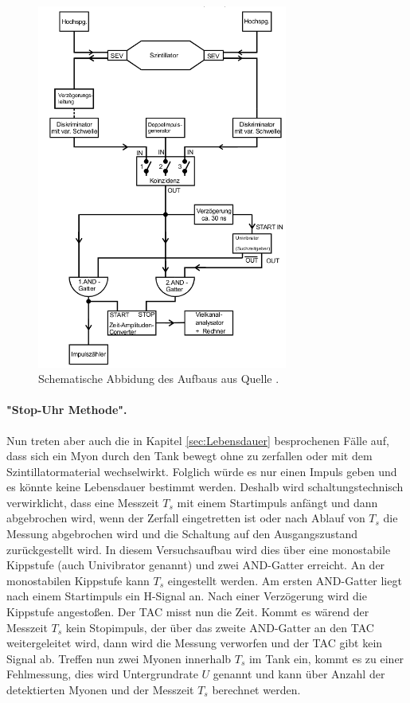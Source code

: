 \begin{figure}
  \centering
  \includegraphics[height=12cm]{pics/Aufbau.png}
  \caption{Schematische Abbidung des Aufbaus aus Quelle \cite{Anleitung}.}
  \label{fig:aufbau}
\end{figure}

\paragraph{"Stop-Uhr Methode".}
Nun treten aber auch die in Kapitel 
\ref{sec:Lebensdauer} besprochenen Fälle auf, dass sich ein Myon durch den Tank bewegt ohne zu zerfallen oder mit 
dem Szintillatormaterial wechselwirkt. Folglich würde es nur einen Impuls geben und es könnte keine Lebensdauer 
bestimmt werden. Deshalb wird schaltungstechnisch verwirklicht, dass eine Messzeit $T_s$ mit einem Startimpuls 
anfängt und dann abgebrochen wird, wenn der Zerfall eingetretten ist oder nach Ablauf von $T_s$ die Messung 
abgebrochen wird und die Schaltung auf den Ausgangszustand zurückgestellt wird. In diesem Versuchsaufbau wird 
dies über eine monostabile Kippstufe (auch Univibrator genannt) und zwei AND-Gatter erreicht. An der monostabilen 
Kippstufe kann $T_s$ eingestellt werden. Am ersten AND-Gatter liegt nach einem Startimpuls ein H-Signal an. 
Nach einer Verzögerung wird die Kippstufe angestoßen. Der TAC misst nun die Zeit. Kommt es wärend der Messzeit 
$T_s$ kein Stopimpuls, der über das zweite AND-Gatter an den TAC weitergeleitet wird, dann wird die Messung 
verworfen und der TAC gibt kein Signal ab. Treffen nun zwei Myonen innerhalb $T_s$ im Tank ein, kommt es 
zu einer Fehlmessung, dies wird Untergrundrate $U$ genannt und kann über Anzahl der detektierten Myonen und der 
Messzeit $T_s$ berechnet werden. 

